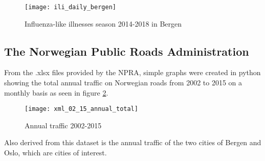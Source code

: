 \begin{figure}[!htb]
\texttt{[image: ili\_daily\_bergen]}
\centering
\caption{Influenza-like illnesses season 2014-2018 in Bergen}
\label{fig:ili_bergen}
\end{figure}

\newpage









\subsection{The Norwegian Public Roads Administration}
From the .xlsx files provided by the NPRA, simple graphs were created in python showing the total annual traffic on Norwegian roads from 2002 to 2015 on a monthly basis as seen in figure \ref{fig:anualtotal}.

\begin{figure}[ht]
\texttt{[image: xml\_02\_15\_annual\_total]}
\centering
\caption{Annual traffic 2002-2015}
\label{fig:anualtotal}
\end{figure}

Also derived from this dataset is the annual traffic of the two cities of Bergen and Oslo, which are cities of interest.


